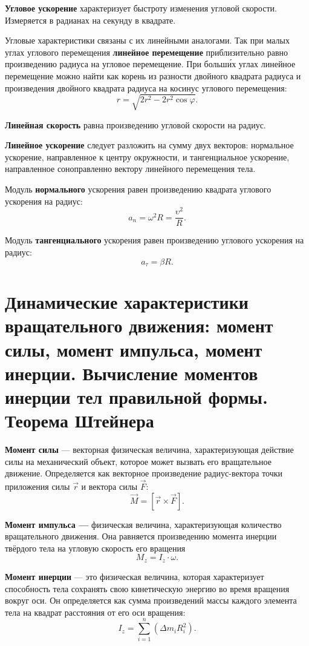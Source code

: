 \textbf{Угловое ускорение} характеризует быстроту изменения угловой
скорости. Измеряется
в радианах на секунду в квадрате.

Угловые характеристики связаны с их линейными аналогами. Так при малых углах
углового перемещения \textbf{линейное перемещение} приблизительно
равно произведению
радиуса на угловое перемещение. При больши́х углах линейное перемещение можно
найти как корень из разности двойного квадрата радиуса и произведения двойного
квадрата радиуса на косинус углового перемещения: \[
  r = \sqrt{2r^2 - 2r^2 \cos{\varphi}}
.\]

\textbf{Линейная скорость} равна произведению угловой скорости на радиус.

\textbf{Линейное ускорение} следует разложить на сумму двух векторов: нормальное
ускорение, направленное к центру окружности, и тангенциальное ускорение,
направленное соноправленно вектору линейного перемещения тела.

Модуль \textbf{нормального} ускорения равен произведению квадрата углового
ускорения на радиус: \[
  a_n = \omega^2 R = \frac{\upsilon^2}{R}
.\]

Модуль \textbf{тангенциального} ускорения равен произведению углового ускорения
на радиус: \[
  a_\tau = \beta R
.\]

\section[седьмой вопрос]{Динамические характеристики вращательного движения:
  момент силы, момент импульса, момент инерции. Вычисление моментов инерции тел
правильной формы. Теорема Штейнера}

\textbf{Момент силы} --- векторная физическая величина, характеризующая
действие силы на механический объект, которое может вызвать его вращательное
движение. Определяется как векторное произведение радиус-вектора точки
приложения силы $\vec {r}$ и вектора силы $\vec {F}$: \[
  \vec{M} = [\vec{r} \times \vec{F}]
.\]

\textbf{Момент импульса ---} физическая величина, характеризующая количество
вращательного движения. Она равняется произведению момента инерции твёрдого
тела на угловую скорость его вращения \[
  M_z = I_z \cdot \omega
.\]

\textbf{Момент инерции} --- это физическая величина, которая характеризует
способность тела сохранять свою кинетическую энергию во время вращения вокруг
оси. Он определяется как сумма произведений массы каждого элемента тела на
квадрат расстояния от его оси вращения: \[
  I_z = \sum_{i=1}^{n} (\Delta m_i R_i^2)%
.\]


